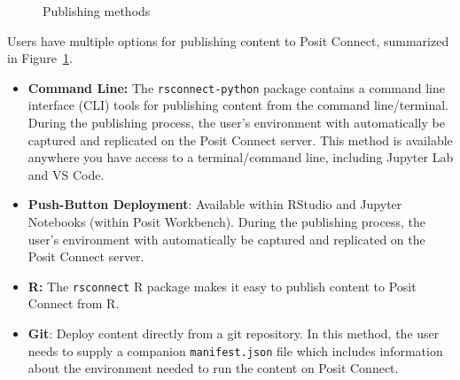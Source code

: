 \documentclass[
  letterpaper,
  DIV=11,
  numbers=noendperiod]{scrreprt}
\begin{document}
\begin{figure}


\caption{\label{fig-publishing-methods}Publishing methods}

\end{figure}%

Users have multiple options for publishing content to Posit Connect,
summarized in Figure~\ref{fig-publishing-methods}.

\begin{itemize}
\item
  \textbf{Command Line:} The \texttt{rsconnect-python} package contains
  a command line interface (CLI) tools for publishing content from the
  command line/terminal. During the publishing process, the user's
  environment with automatically be captured and replicated on the Posit
  Connect server. This method is available anywhere you have access to a
  terminal/command line, including Jupyter Lab and VS Code.
\item
  \textbf{Push-Button Deployment}: Available within RStudio and Jupyter
  Notebooks (within Posit Workbench). During the publishing process, the
  user's environment with automatically be captured and replicated on
  the Posit Connect server.
\item
  \textbf{R:} The \texttt{rsconnect} R package makes it easy to publish
  content to Posit Connect from R.
\item
  \textbf{Git}: Deploy content directly from a git repository. In this
  method, the user needs to supply a companion \texttt{manifest.json}
  file which includes information about the environment needed to run
  the content on Posit Connect.
\end{itemize}
\end{document}
